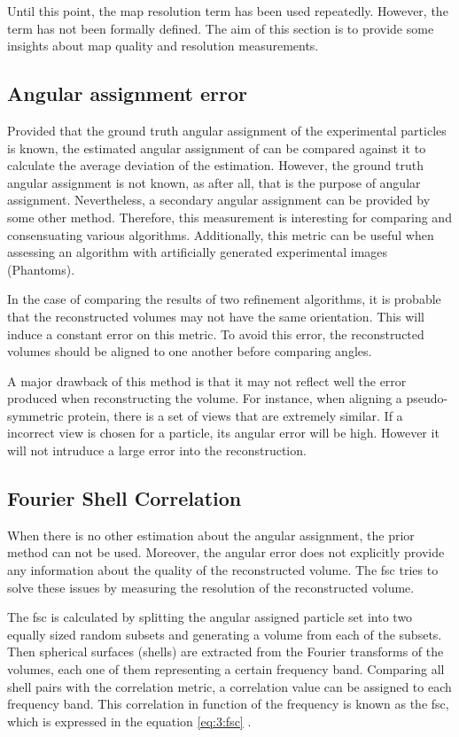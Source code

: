 \documentclass[../main.tex]{subfiles}
\begin{document}
Until this point, the map resolution term has been used repeatedly. However, the term has not been formally defined. The aim of this section is to provide some insights about map quality and resolution measurements.

\subsection{Angular assignment error}
Provided that the ground truth angular assignment of the experimental particles is known, the estimated angular assignment of can be compared against it to calculate the average deviation of the estimation. However, the ground truth angular assignment is not known, as after all, that is the purpose of angular assignment. Nevertheless, a secondary angular assignment can be provided by some other method. Therefore, this measurement is interesting for comparing and consensuating various algorithms. Additionally, this metric can be useful when assessing an algorithm with artificially generated experimental images (Phantoms).

In the case of comparing the results of two refinement algorithms, it is probable that the reconstructed volumes may not have the same orientation. This will induce a constant error on this metric. To avoid this error, the reconstructed volumes should be aligned to one another before comparing angles.

A major drawback of this method is that it may not reflect well the error produced when reconstructing the volume. For instance, when aligning a pseudo-symmetric protein, there is a set of views that are extremely similar. If a incorrect view is chosen for a particle, its angular error will be high. However it will not intruduce a large error into the reconstruction.

\subsection{Fourier Shell Correlation}
When there is no other estimation about the angular assignment, the prior method can not be used. Moreover, the angular error does not explicitly provide any information about the quality of the reconstructed volume. The \gls{fsc} tries to solve these issues by measuring the resolution of the reconstructed volume\cite{sorzano2017a}.

The \gls{fsc} is calculated by splitting the angular assigned particle set into two equally sized random subsets and generating a volume from each of the subsets. Then spherical surfaces (shells) are extracted from the Fourier transforms of the volumes, each one of them representing a certain frequency band. Comparing all shell pairs with the correlation metric, a correlation value can be assigned to each frequency band. This correlation in function of the frequency is known as the \gls{fsc}, which is expressed in the equation \eqref{eq:3:fsc} \cite{dubach2020}\cite{sorzano2017a}.
\end{document}
